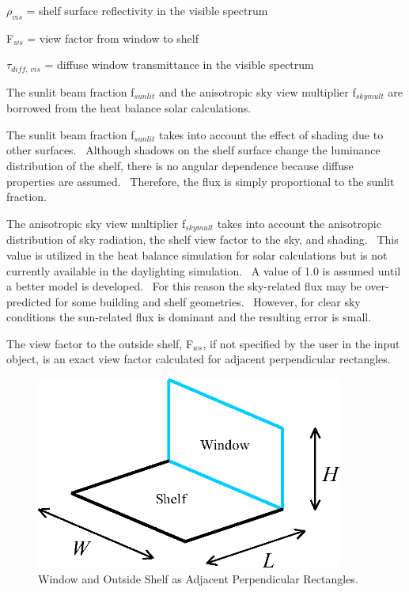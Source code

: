 \(\rho_{vis}\) = shelf surface reflectivity in the visible spectrum

F\(_{ws}\) = view factor from window to shelf

\(\tau_{diff,\, vis}\) = diffuse window transmittance in the visible spectrum

The sunlit beam fraction f\(_{sunlit}\) and the anisotropic sky view multiplier f\(_{skymult}\) are borrowed from the heat balance solar calculations.

The sunlit beam fraction f\(_{sunlit}\) takes into account the effect of shading due to other surfaces.~ Although shadows on the shelf surface change the luminance distribution of the shelf, there is no angular dependence because diffuse properties are assumed.~ Therefore, the flux is simply proportional to the sunlit fraction.

The anisotropic sky view multiplier f\(_{skymult}\) takes into account the anisotropic distribution of sky radiation, the shelf view factor to the sky, and shading.~ This value is utilized in the heat balance simulation for solar calculations but is not currently available in the daylighting simulation.~ A value of 1.0 is assumed until a better model is developed.~ For this reason the sky-related flux may be over-predicted for some building and shelf geometries.~ However, for clear sky conditions the sun-related flux is dominant and the resulting error is small.

The view factor to the outside shelf, F\(_{ws}\), if not specified by the user in the input object, is an exact view factor calculated for adjacent perpendicular rectangles.

\begin{figure}[hbtp] %
\centering
\includegraphics[width=0.9\textwidth, height=0.9\textheight, keepaspectratio=true]{media/image899.png}
\caption{Window and Outside Shelf as Adjacent Perpendicular Rectangles. \protect \label{fig:window-and-outside-shelf-as-adjacent}}
\end{figure}

